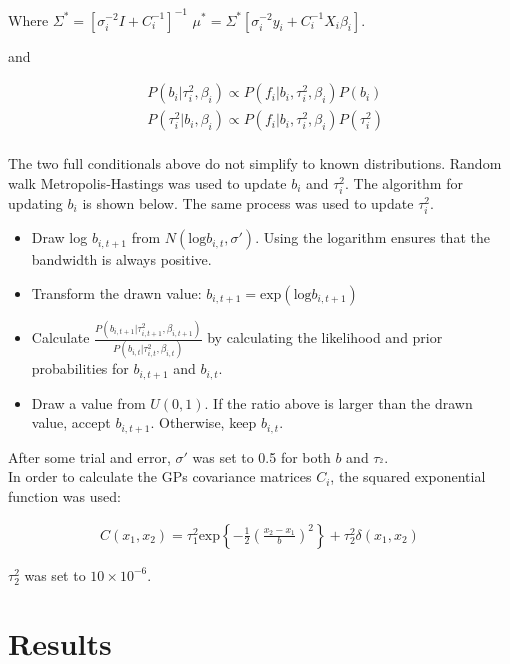 \documentclass[paper=a4, fontsize=11pt]{scrartcl}
\begin{document}
Where  $\Sigma^*=[\sigma_i^{-2}I + C_i^{-1}]^{-1} $ $\mu^*=\Sigma^*[\sigma_i^{-2}y_i + C_i^{-1}X_i\beta_i]$.


and

\begin{align*}
     & P(b_i |\tau_i^2, \beta_i)  \propto P(f_i|b_i, \tau_i^2, \beta_i)P(b_i) \\
     & P(\tau_i^2 |b_i, \beta_i)  \propto P(f_i|b_i, \tau_i^2, \beta_i)P(\tau_i^2) \\
\end{align*}

The two full conditionals above do not simplify to known distributions. Random walk Metropolis-Hastings was used to update $b_i$ and $\tau_i^2$. The algorithm for updating $b_i$ is shown below. The same process was used to update $\tau_i^2$.
\begin{itemize}
    \item Draw \mbox{log} $b_{i, t+1}$ from $N( \mbox{log}b_{i, t}, \sigma' )$. Using the logarithm ensures that the bandwidth is always positive.
    \item Transform the drawn value: $b_{i, t+1} = \mbox{exp} (\mbox{log} b_{i, t+1})$
    \item Calculate $\frac{P(b_{i, t+1} |\tau_{i, t+1}^2, \beta_{i, t+1})}{P(b_{i, t} |\tau_{i, t}^2, \beta_{i, t})}$ by calculating the likelihood and prior probabilities for $b_{i, t+1}$ and $b_{i, t}$.
    \item Draw a value from $U(0,1)$. If the ratio above is larger than the drawn value, accept $b_{i, t+1}$. Otherwise, keep $b_{i, t}$.
\end{itemize}


After some trial and error, $\sigma'$ was set to 0.5 for both $b$ and $\tau_^2$.\\

In order to calculate the GPs covariance matrices $C_i$, the squared exponential function was used:

\begin{align*}
    C(x_1, x_2) = \tau_1^2 \mbox{exp} \left\{-\frac{1}{2} \left( \frac{x_2 - x_1}{b}\right)^2 \right\} + \tau_2^2  \delta(x_1, x_2)
\end{align*}

$\tau^2_2$ was set to $10 \times 10^{-6}$.

\section{Results}
\end{document}
